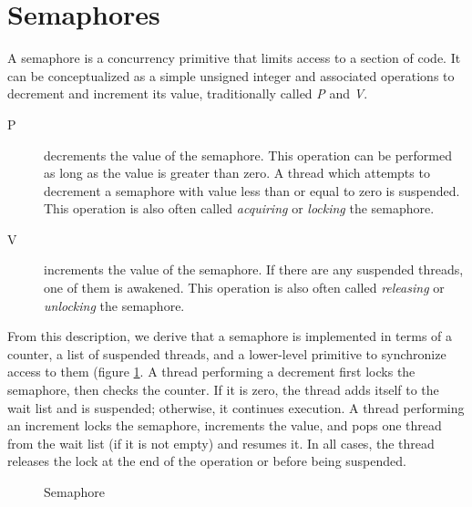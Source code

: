 \section{Semaphores}

\label{subsec:conc:sem}

A semaphore is a concurrency primitive that limits access to a section of code.
It can be conceptualized as a simple unsigned integer and associated operations
to decrement and increment its value, traditionally called \textit{P} and
\textit{V}\footnotemark.


\begin{description}
    \item[P]
        decrements the value of the semaphore.  This operation can be performed
        as long as the value is greater than zero.  A thread which attempts to
        decrement a semaphore with value less than or equal to zero is
        suspended.  This operation is also often called \textit{acquiring} or
        \textit{locking} the semaphore.
    \item[V]
        increments the value of the semaphore.  If there are any suspended
        threads, one of them is awakened.  This operation is also often called
        \textit{releasing} or \textit{unlocking} the semaphore.
\end{description}

From this description, we derive that a semaphore is implemented in terms of a
counter, a list of suspended threads, and a lower-level primitive to synchronize
access to them (figure \ref{fig:conc:sem}.  A thread performing a decrement
first locks the semaphore, then checks the counter.  If it is zero, the thread
adds itself to the wait list and is suspended; otherwise, it continues
execution.  A thread performing an increment locks the semaphore, increments the
value, and pops one thread from the wait list (if it is not empty) and resumes
it.  In all cases, the thread releases the lock at the end of the operation or
before being suspended.

\begin{figure}[ht]
    \centering
    \caption{Semaphore}
    \label{fig:conc:sem}
\end{figure}

